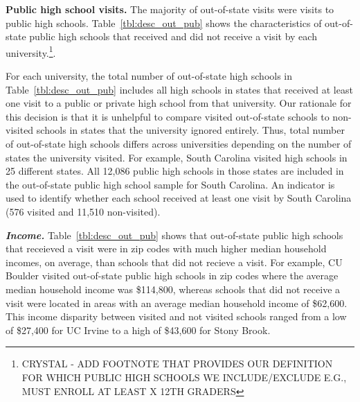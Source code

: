 \documentclass[twoside]{article}
\begin{document}
\textbf{Public high school visits.} The majority of out-of-state visits were visits to public high schools. Table~\ref{tbl:desc_out_pub} shows the characteristics of out-of-state public high schools that received and did not receive a visit by each university.\footnote{CRYSTAL - ADD FOOTNOTE THAT PROVIDES OUR DEFINITION FOR WHICH PUBLIC HIGH SCHOOLS WE INCLUDE/EXCLUDE E.G., MUST ENROLL AT LEAST X 12TH GRADERS}. 





For each university, the total number of out-of-state high schools in Table~\ref{tbl:desc_out_pub} includes all high schools in states that received at least one visit to a public or private high school from that university.  Our rationale for this decision is that it is unhelpful to compare visited out-of-state schools to non-visited schools in states that the university ignored entirely. Thus, total number of out-of-state high schools differs across universities depending on the number of states the university visited.  For example, South Carolina visited high schools in 25 different states. All 12,086 public high schools in those states are included in the out-of-state public high school sample for South Carolina. An indicator is used to identify whether each school received at least one visit by South Carolina (576 visited and 11,510 non-visited).

\textbf{\textit{Income.}} Table~\ref{tbl:desc_out_pub} shows that out-of-state public high schools that receieved a visit were in zip codes with much higher median household incomes, on average, than schools that did not recieve a visit. For example, CU Boulder visited out-of-state public high schools in zip codes where the average median household income was \$114,800, whereas schools that did not receive a visit were located in areas with an average median household income of \$62,600. This income disparity between visited and not visited schools ranged from a low of \$27,400 for UC Irvine to a high of \$43,600 for Stony Brook. %
\end{document}
